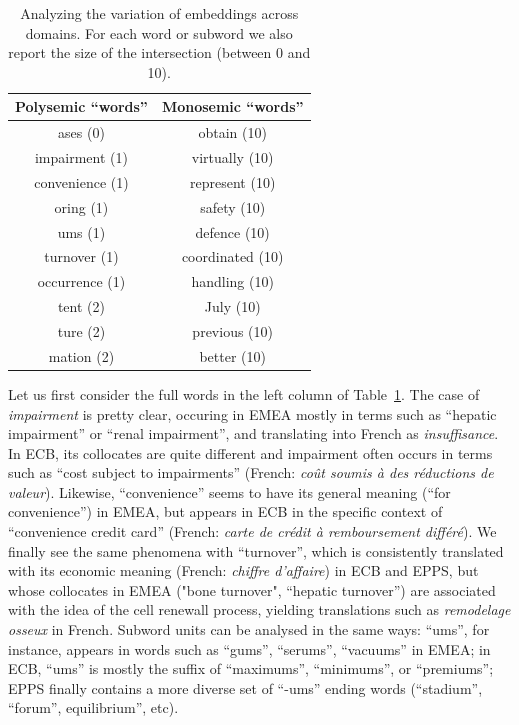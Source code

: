 \begin{table}[h]
  \centering
  \begin{tabular}{c|c}
    Polysemic ``words'' & Monosemic ``words'' \\ \hline
     ases (0) &               obtain (10) \\       
     impairment (1) &     virtually (10) \\    
     convenience (1) &    represent (10) \\    
     oring (1) &              safety (10) \\       
     ums (1) &               defence (10) \\      
     turnover (1) &         coordinated (10) \\  
     occurrence (1) &     handling (10) \\     
     tent (2) &               July (10) \\         
     ture (2) &               previous (10) \\     
     mation (2) &           better (10) \\ \hline
  \end{tabular}
  \caption{Analyzing the variation of embeddings across domains. For each word or subword we also report the size of the intersection (between 0 and 10).}
  \label{tab:embeddings-chap5}
\end{table}

Let us first consider the full words in the left column of Table~\ref{tab:embeddings-chap5}. The case of \emph{impairment} is pretty clear, occuring in EMEA mostly in terms such as ``hepatic impairment'' or ``renal impairment'', and translating into French as \textsl{insuffisance}. In ECB, its collocates are quite different and impairment often occurs in terms such as ``cost subject to impairments'' (French: \emph{co\^ut soumis \`a des r\'eductions de valeur}). Likewise, ``convenience'' seems to have its general meaning (``for convenience'') in EMEA, but appears in ECB in the specific context of ``convenience credit card'' (French: \textsl{carte de cr\' edit \`a remboursement diff\'er\'e}). We finally see the same phenomena with ``turnover'', which is consistently translated with its economic meaning (French: \textsl{chiffre d'affaire}) in ECB and EPPS, but whose collocates in EMEA ("bone turnover", ``hepatic turnover'') are associated with the idea of the cell renewall process, yielding translations such as \textsl{remodelage osseux} in French. Subword units can be analysed in the same ways: ``ums'', for instance, appears in words such as ``gums'', ``serums'', ``vacuums''  in EMEA; in ECB, ``ums'' is mostly the suffix of ``maximums'', ``minimums'', or ``premiums''; EPPS finally contains a more diverse set of ``-ums'' ending words (``stadium'', ``forum'', equilibrium'', etc). 

